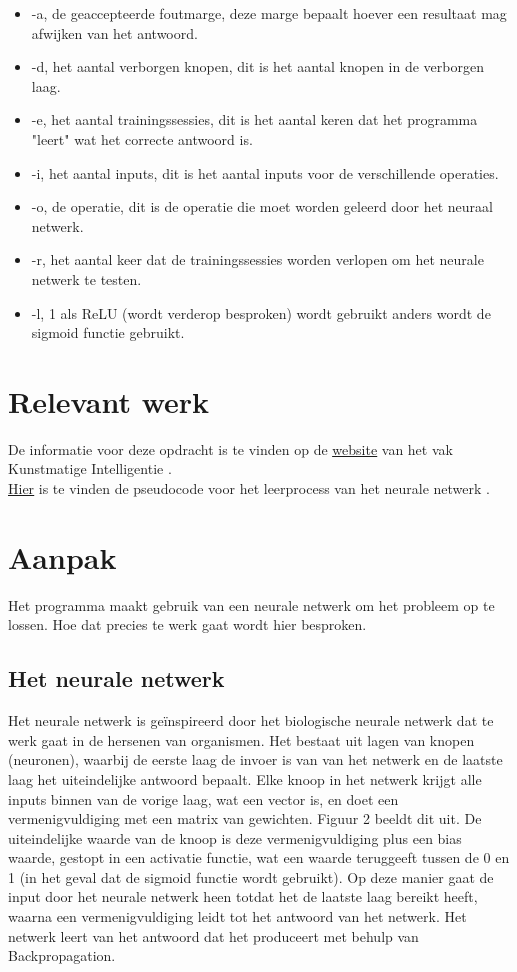 \documentclass[10pt]{article}
\begin{document}
\begin{itemize}
    \item -a, de geaccepteerde foutmarge, deze marge bepaalt hoever een resultaat mag afwijken van het antwoord.
    \item -d, het aantal verborgen knopen, dit is het aantal knopen in de verborgen laag.
    \item -e, het aantal trainingssessies, dit is het aantal keren dat het programma "leert" wat het correcte antwoord is.
    \item -i, het aantal inputs, dit is het aantal inputs voor de verschillende operaties.
    \item -o, de operatie, dit is de operatie die moet worden geleerd door het neuraal netwerk.
    \item -r, het aantal keer dat de trainingssessies worden verlopen om het neurale netwerk te testen.
    \item -l, 1 als ReLU (wordt verderop besproken) wordt gebruikt anders wordt de sigmoid functie gebruikt.
\end{itemize}

\section{Relevant werk}
De informatie voor deze opdracht is te vinden op de \href{http://liacs.leidenuniv.nl/~kosterswa/AI/nn18.html}{\underline{website}} van het vak Kunstmatige Intelligentie \cite{assignment}. \\ \href{http://liacs.leidenuniv.nl/~kosterswa/AI/nnhelp.html}{\underline{Hier}} is te vinden de pseudocode voor het leerprocess van het neurale netwerk \cite{backprop}.

\section{Aanpak}
Het programma maakt gebruik van een neurale netwerk om het probleem op te lossen. Hoe dat precies te werk gaat wordt hier besproken.

\subsection{Het neurale netwerk}
Het neurale netwerk is ge\"inspireerd door het biologische neurale netwerk dat te werk gaat in de hersenen van organismen. Het bestaat uit lagen van knopen (neuronen), waarbij de eerste laag de invoer is van van het netwerk en de laatste laag het uiteindelijke antwoord bepaalt. Elke knoop in het netwerk krijgt alle inputs binnen van de vorige laag, wat een vector is, en doet een vermenigvuldiging met een matrix van gewichten. Figuur 2 \cite{chapter} beeldt dit uit. De uiteindelijke waarde van de knoop is deze vermenigvuldiging plus een bias waarde, gestopt in een activatie functie, wat een waarde teruggeeft tussen de 0 en 1 (in het geval dat de sigmoid functie wordt gebruikt). Op deze manier gaat de input door het neurale netwerk heen totdat het de laatste laag bereikt heeft, waarna een vermenigvuldiging leidt tot het antwoord van het netwerk. Het netwerk leert van het antwoord dat het produceert met behulp van Backpropagation. 
\end{document}
